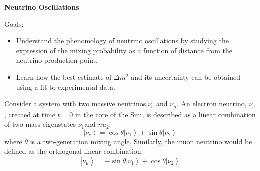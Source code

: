 \documentclass[12pt]{article}
\begin{document}
\begin{center}
{\large\bf Neutrino Oscillations}
\end{center}
\vskip0.2in
Goals:
\begin{itemize}
\item Understand the phenomology of neutrino oscillations by
  studying the expression of the mixing probability as a function
  of distance from the neutrino production point.
\item Learn how the best estimate of $\Delta m^2$ and its uncertainty
can be obtained using a fit to experimental data.
\end{itemize}
Consider a system with two massive neutrinos,$\nu_e$ and $\nu_\mu$.
An electron neutrino, $\nu_e$, created at time $t= 0$ in the core
of the Sun, is described as a linear combination of two mass
eigenstates $\nu_1$and $nu_2$:
$$
\left | \nu_e \right \rangle = \cos\theta \left | \nu_1 \right \rangle + \sin \theta  \left |\nu_2 \right \rangle
$$
where $\theta$ is a two-generation mixing angle.
Similarly, the muon neutrino would be defined as the orthogonal
linear combination:
$$
\left | \nu_\mu \right \rangle = -\sin\theta \left | \nu_1 \right \rangle +
\cos \theta  \left |\nu_2 \right \rangle
$$
\end{document}
